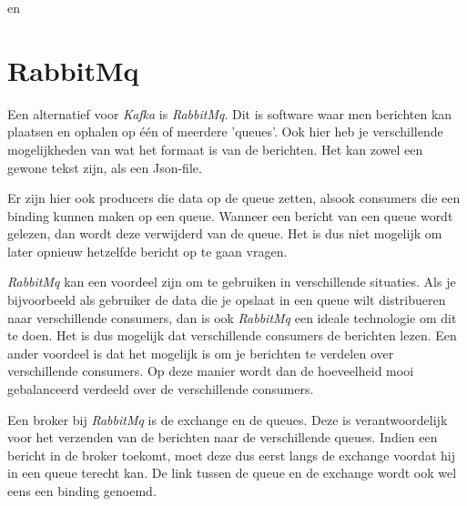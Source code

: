 \autocite{Sookocheff2015} en \autocite{Johansson2016}

\section{RabbitMq}

Een alternatief voor \emph{Kafka} is \emph{RabbitMq}. Dit is software waar men berichten kan plaatsen en ophalen op één of meerdere 'queues'. Ook hier heb je verschillende mogelijkheden van wat het formaat is van de berichten. Het kan zowel een gewone tekst zijn, als een Json-file. 

Er zijn hier ook producers die data op de queue zetten, alsook consumers die een binding kunnen maken op een queue. Wanneer een bericht van een queue wordt gelezen, dan wordt deze verwijderd van de queue. Het is dus niet mogelijk om later opnieuw hetzelfde bericht op te gaan vragen. 

\emph{RabbitMq} kan een voordeel zijn om te gebruiken in verschillende situaties. Als je bijvoorbeeld als gebruiker de data die je opslaat in een queue wilt distribueren naar verschillende consumers, dan is ook \emph{RabbitMq} een ideale technologie om dit te doen. Het is dus mogelijk dat verschillende consumers de berichten lezen. Een ander voordeel is dat het mogelijk is om je berichten te verdelen over verschillende consumers. Op deze manier wordt dan de hoeveelheid mooi gebalanceerd verdeeld over de verschillende consumers.

Een broker bij \emph{RabbitMq} is de exchange en de queues. Deze is verantwoordelijk voor het verzenden van de berichten naar de verschillende queues. Indien een bericht in de broker toekomt, moet deze dus eerst langs de exchange voordat hij in een queue terecht kan. De link tussen de queue en de exchange wordt ook wel eens een binding genoemd.

